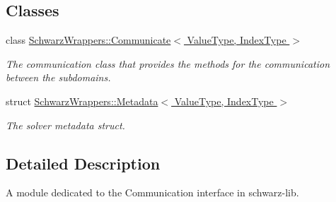 \subsection*{Classes}
\begin{DoxyCompactItemize}
\item 
class \hyperlink{classSchwarzWrappers_1_1Communicate}{Schwarz\+Wrappers\+::\+Communicate$<$ Value\+Type, Index\+Type $>$}
\begin{DoxyCompactList}\small\item\em The communication class that provides the methods for the communication between the subdomains. \end{DoxyCompactList}\item 
struct \hyperlink{structSchwarzWrappers_1_1Metadata}{Schwarz\+Wrappers\+::\+Metadata$<$ Value\+Type, Index\+Type $>$}
\begin{DoxyCompactList}\small\item\em The solver metadata struct. \end{DoxyCompactList}\end{DoxyCompactItemize}


\subsection{Detailed Description}
A module dedicated to the Communication interface in schwarz-\/lib. 

